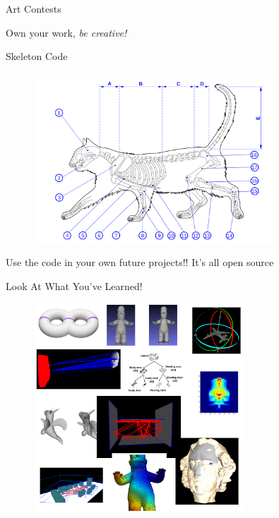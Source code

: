 \documentclass{beamer}
\begin{document}
\begin{frame}{Art Contests}

Own your work, {\em be creative!}

\end{frame}


\begin{frame}{Skeleton Code}

\begin{figure}[t]
    \includegraphics[width=0.8\textwidth]{catskeleton.png}
\end{figure}

Use the code in your own future projects!!  It's all open source

\end{frame}



\begin{frame}{Look At What You've Learned!}

\begin{figure}[t]
    \includegraphics[width=0.7\textwidth]{CourseInReview.png}
\end{figure}


\end{frame}
\end{document}
